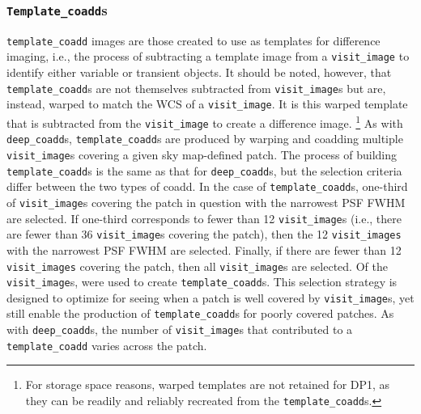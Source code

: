 \subsubsection{\texttt{Template\_coadd}s}
%
\texttt{template\_coadd} images \citep[][]{10.71929/rubin/2570314} are those created to use as templates for difference imaging, i.e., the process of subtracting a template image from a \texttt{visit\_image} to identify either variable or \gls{transient} objects. It should be noted, however, that \texttt{template\_coadd}s are not themselves subtracted from \texttt{visit\_image}s but are, instead, warped to match the \gls{WCS} of a \texttt{visit\_image}.
It is this warped template that is subtracted from the \texttt{visit\_image} to create a difference image.
\footnote{For storage space reasons, warped templates are not retained for \gls{DP1}, as they can be readily and reliably recreated from the \texttt{template\_coadd}s.}
As with \texttt{deep\_coadd}s, \texttt{template\_coadd}s are produced by warping and coadding multiple \texttt{visit\_image}s covering a given sky map-defined \gls{patch}.
The process of building \texttt{template\_coadd}s is the same as that for \texttt{deep\_coadd}s, but the selection criteria differ between the two types of coadd.
In the case of \texttt{template\_coadd}s, one-third of \texttt{visit\_image}s covering the \gls{patch} in question with the narrowest \gls{PSF} \gls{FWHM} are selected.
If one-third corresponds to fewer than 12 \texttt{visit\_image}s (i.e., there are fewer than 36 \texttt{visit\_image}s covering the \gls{patch}), then the 12 \texttt{visit\_images} with the narrowest \gls{PSF} \gls{FWHM} are selected.
Finally, if there are fewer than 12 \texttt{visit\_images} covering the \gls{patch}, then all \texttt{visit\_image}s are selected.
Of the \nvisitimages \texttt{visit\_image}s, \ntemplatecoaddvisitimages were used to create \texttt{template\_coadd}s.
This selection strategy is designed to optimize for \gls{seeing} when a \gls{patch} is well covered by \texttt{visit\_image}s, yet still enable the production of \texttt{template\_coadd}s for poorly covered patches.
As with \texttt{deep\_coadd}s, the number of \texttt{visit\_image}s that contributed to a \texttt{template\_coadd} varies across the patch.

